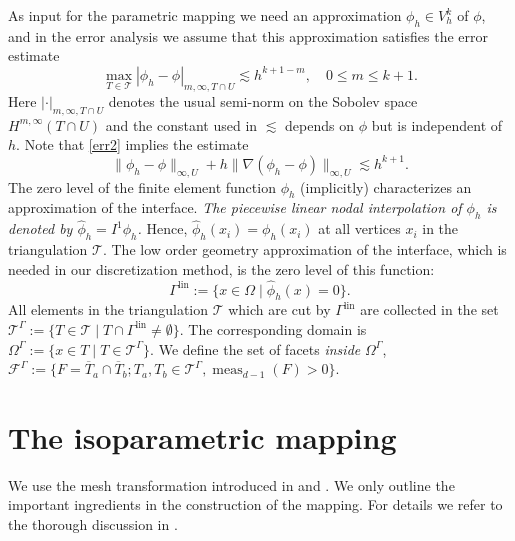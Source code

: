 \documentclass[final]{siamltex}
\begin{document}
As input for the parametric mapping we need an approximation $\phi_h \in V_h^k$ of $\phi$, and in the error analysis we assume that this approximation satisfies the error estimate
\begin{equation} \label{err2}
  \max_{T\in {\mathcal{T}}} |\phi_h - \phi|_{m,\infty,T \cap U} \lesssim h^{k+1-m},\quad 0 \leq m \leq k+1.
\end{equation}
Here $|\cdot|_{m,\infty,T\cap U}$ denotes the usual semi-norm on the Sobolev space $H^{m,\infty}(T\cap U)$ and the constant used in $\lesssim$ depends on $\phi$ but is independent of $h$.
Note that \eqref{err2} implies the estimate
\begin{equation} \label{err1}
 \|\phi_h - \phi\|_{\infty, U} + h\|\nabla(\phi_h - \phi)\|_{\infty, U} \lesssim h^{k+1}. 
\end{equation}
The zero level of the finite element function $\phi_h$ (implicitly) characterizes an approximation of the interface. 
\emph{The piecewise linear nodal interpolation of $\phi_h$ is denoted by ${\hat \phi_h} = {I^1} \phi_h$.} Hence, ${\hat \phi_h}(x_i)=\phi_h(x_i)$ at all vertices $x_i$ in the triangulation ${\mathcal{T}}$. 
The low order geometry approximation of the interface, which is needed in our discretization method, is the zero level of this function:
\[
  {\Gamma^{\text{lin}}} := \{ x\in\Omega\mid {\hat \phi_h}(x) = 0\}.
\]
All elements in the triangulation ${\mathcal{T}}$ which are cut by ${\Gamma^{\text{lin}}}$ are collected in the set ${{\mathcal{T}}^{\Gamma}} := \{T \in {\mathcal{T}}\mid T \cap {\Gamma^{\text{lin}}} \neq \emptyset \}$. The corresponding domain is ${\Omega^{\Gamma}} := \{ x \in T \mid T\in {{\mathcal{T}}^{\Gamma}}\}$. 
We define the set of facets \emph{inside} $\Omega^\Gamma$, $\mathcal{F}^\Gamma := \{ F = \overline{T}_a \cap \overline{T}_b; T_a,T_b \in {\mathcal{T}}^\Gamma, \operatorname{\operatorname{meas}}_{d-1}(F) > 0\}$.

\section{The isoparametric mapping} \label{sec:mapping}
We use the mesh transformation introduced in \cite{lehrenfeld2015cmame} and \cite{CLARH1}. 
We only outline the important ingredients in the construction of the mapping. For details we refer to the thorough discussion in \cite[Section 3]{CLARH1}. 
\end{document}
